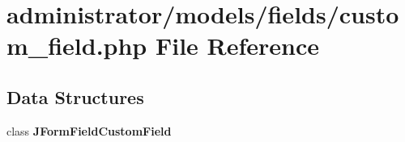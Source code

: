 \section{administrator/models/fields/custom\+\_\+field.php File Reference}
\label{administrator_2models_2fields_2custom__field_8php}
\subsection*{Data Structures}
\begin{DoxyCompactItemize}
\item 
class \textbf{ J\+Form\+Field\+Custom\+Field}
\end{DoxyCompactItemize}
